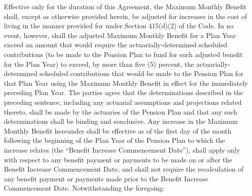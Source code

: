 \documentclass[
]{book}
\begin{document}
\begin{enumerate}
  Effective only for the duration of this Agreement, the Maximum Monthly Benefit shall, except as otherwise provided herein, be adjusted for increases in the cost of living in the manner provided for under Section 415(d)(2) of the Code. In no event, however, shall the adjusted Maximum Monthly Benefit for a Plan Year exceed an amount that would require the actuarially-determined scheduled contributions (to be made to the Pension Plan to fund for such adjusted benefit for the Plan Year) to exceed, by more than five (5) percent, the actuarially-determined scheduled contributions that would be made to the Pension Plan for that Plan Year using the Maximum Monthly Benefit in effect for the immediately preceding Plan Year. The parties agree that the determinations described in the preceding sentence, including any actuarial assumptions and projections related thereto, shall be made by the actuaries of the Pension Plan and that any such determinations shall be binding and conclusive. Any increase in the Maximum Monthly Benefit hereunder shall be effective as of the first day of the month following the beginning of the Plan Year of the Pension Plan to which the increase relates (the ``Benefit Increase Commencement Date''), shall apply only with respect to any benefit payment or payments to be made on or after the Benefit Increase Commencement Date, and shall not require the recalculation of any benefit payment or payments made prior to the Benefit Increase Commencement Date.
  Notwithstanding the foregoing:


\end{enumerate}
\end{document}
